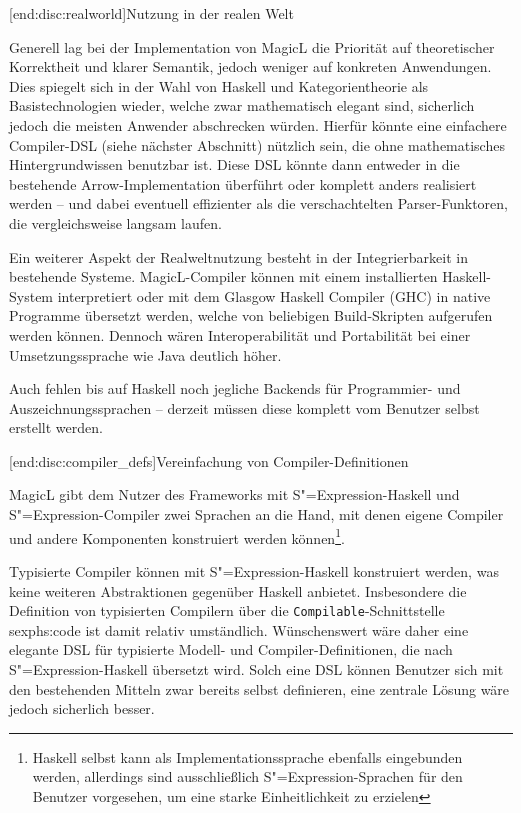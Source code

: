 \documentclass[11pt, a4paper, bibgerm]{scrbook}
\newcommand\icode[1]{\lstinline?#1?}
\newcommand\lsubsection{}
\newcommand\sref{}
\newcommand{\sexp}{S"=Expression}
\begin{document}
\lsubsection[end:disc:realworld]{Nutzung in der realen Welt}

Generell lag bei der Implementation von MagicL die Priorität auf
theoretischer Korrektheit und klarer Semantik, jedoch weniger auf
konkreten Anwendungen. Dies spiegelt sich in der Wahl von Haskell und
Kategorientheorie als Basistechnologien wieder, welche zwar mathematisch
elegant sind, sicherlich jedoch die meisten Anwender abschrecken
würden. Hierfür könnte eine einfachere Compiler-DSL (siehe nächster
Abschnitt) nützlich sein, die ohne mathematisches Hintergrundwissen
benutzbar ist. Diese DSL könnte dann entweder in die bestehende
Arrow-Implementation überführt oder komplett anders realisiert werden --
und dabei eventuell effizienter als die verschachtelten
Parser-Funktoren, die vergleichsweise langsam laufen.

Ein weiterer Aspekt der Realweltnutzung besteht in der Integrierbarkeit
in bestehende Systeme. MagicL-Compiler können mit einem installierten
Haskell-System interpretiert oder mit dem Glasgow Haskell Compiler
(GHC) \cite{Ghc} in native Programme übersetzt werden, welche von
beliebigen Build-Skripten aufgerufen werden können. Dennoch wären
Interoperabilität und Portabilität bei einer Umsetzungssprache wie
Java deutlich höher.

Auch fehlen bis auf Haskell noch jegliche Backends für Programmier- und
Auszeichnungssprachen -- derzeit müssen diese komplett vom Benutzer
selbst erstellt werden.

\lsubsection[end:disc:compiler_defs]{Vereinfachung von
  Compiler-Definitionen} 

MagicL gibt dem Nutzer des Frameworks mit \sexp{}-Haskell und
\sexp{}-Compiler zwei Sprachen an die Hand, mit denen eigene Compiler
und andere Komponenten konstruiert werden können\footnote{Haskell selbst
  kann als Implementationssprache ebenfalls eingebunden werden,
  allerdings sind ausschließlich \sexp{}-Sprachen für den Benutzer
  vorgesehen, um eine starke Einheitlichkeit zu erzielen}.

Typisierte Compiler können mit \sexp{}-Haskell konstruiert werden, was
keine weiteren Abstraktionen gegenüber Haskell anbietet. Insbesondere
die Definition von typisierten Compilern über die
\icode{Compilable}-Schnittstelle \sref{sexphs:code} ist damit relativ
umständlich. Wünschenswert wäre daher eine elegante DSL für typisierte
Modell- und Compiler-Definitionen, die nach \sexp{}-Haskell übersetzt
wird. Solch eine DSL können Benutzer sich mit den bestehenden Mitteln
zwar bereits selbst definieren, eine zentrale Lösung wäre jedoch
sicherlich besser.
\end{document}
